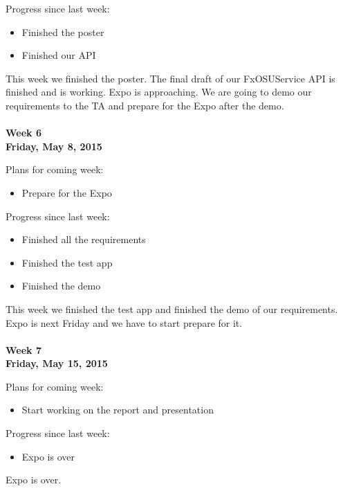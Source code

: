 \noindent Progress since last week:
\begin{itemize}
\item Finished the poster
\item Finished our API
\end{itemize}

\noindent This week we finished the poster. The final draft of our FxOSUService API is finished and is working. Expo is approaching. We are going to demo our requirements to the TA and prepare for the Expo after the demo. \\
\\
\textbf{Week 6\\Friday, May 8, 2015\\}

\noindent Plans for coming week:
\begin{itemize}
\item Prepare for the Expo
\end{itemize}

\noindent Progress since last week:
\begin{itemize}
\item Finished all the requirements
\item Finished the test app
\item Finished the demo
\end{itemize}

\noindent This week we finished the test app and finished the demo of our requirements. Expo is next Friday and we have to start prepare for it. \\
\\
\textbf{Week 7\\Friday, May 15, 2015\\}

\noindent Plans for coming week:
\begin{itemize}
\item Start working on the report and presentation
\end{itemize}

\noindent Progress since last week:
\begin{itemize}
\item Expo is over
\end{itemize}

Expo is over. 
